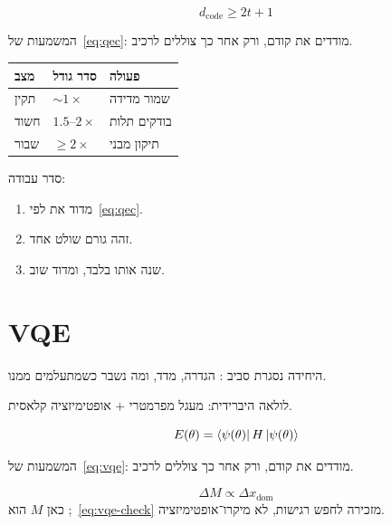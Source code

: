 \begin{equation}
\label{eq:qec}
d_{\mathrm{code}} \ge 2t+1
\end{equation}

המשמעות של~\eqref{eq:qec}: מודדים את  קודם, ורק אחר כך צוללים לרכיב.

\begin{tablebox}\centering\small
\begin{tabular}{@{}lll@{}}
\toprule
\textbf{מצב} & \textbf{סדר גודל} & \textbf{פעולה}\\
\midrule
תקין & $\sim 1\times$ & שמור מדידה\\
חשוד & $1.5$–$2\times$ & בודקים תלות\\
שבור & $\ge 2\times$ & תיקון מבני\\
\bottomrule
\end{tabular}
\end{tablebox}

סדר עבודה:
\begin{enumerate}
\item[(\textbf{א})] מדוד את  לפי~\eqref{eq:qec}.
\item[(\textbf{ב})] זהה גורם שולט אחד.
\item[(\textbf{ג})] שנה אותו בלבד, ומדוד שוב.
\end{enumerate}

\chapter{VQE}
\label{ch:vqe}

היחידה נסגרת סביב : הגדרה, מדד, ומה נשבר כשמתעלמים ממנו.

\begin{notebox}[frametitle={הערה — VQE}]
לולאה היברידית: מעגל מפרמטרי + אופטימיזציה קלאסית.
\end{notebox}

\begin{equation}
\label{eq:vqe}
E(\theta)=\left\langle\psi(\theta)\right|H\left|\psi(\theta)\right\rangle
\end{equation}

המשמעות של~\eqref{eq:vqe}: מודדים את  קודם, ורק אחר כך צוללים לרכיב.

\begin{equation}
\label{eq:vqe-check}
\Delta M \propto \Delta x_{\mathrm{dom}}
\end{equation}
כאן $M$ הוא ;~\eqref{eq:vqe-check} מזכירה לחפש רגישות, לא מיקרו־אופטימיזציה.

